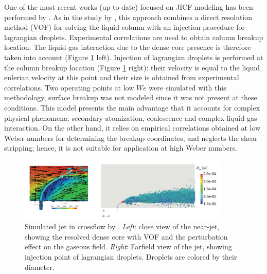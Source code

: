 One of the most recent works (up to date) focused on JICF modeling has been performed by . As in the study by , this approach combines a direct resolution method (VOF) for solving the liquid column with an injection procedure for lagrangian droplets. Experimental correlations are used to obtain column breakup location. The liquid-gas interaction due to the dense core presence is therefore taken into account (Figure \ref{fig:fontes_2019_lagrangian_fields} left). Injection of lagrangian droplets is performed at the column breakup location (Figure \ref{fig:fontes_2019_lagrangian_fields} right): their velocity is equal to the liquid eulerian velocity at this point and their size is obtained from experimental correlations. Two operating points at low $We$ were simulated with this methodology, surface breakup was not modeled since it was not present at these conditions. This model presents the main advantage that it accounts for complex physical phenomena: secondary atomization, coalescence and complex liquid-gas interaction. On the other hand, it relies on empirical correlations obtained at low Weber numbers for determining the breakup coordinates, and neglects the shear stripping; hence, it is not suitable for application at high Weber numbers.

\clearpage

\begin{figure}[ht]
    \centering
    \includegraphics[width=0.9\textwidth]{./part1_numerical_approaches/figures_ch3/fontes_2019_lagrangian_fields}
       \centering
    \caption{Simulated jet in crossflow by . \textsl{Left}: close view of the near-jet, showing the resolved dense core with VOF and the perturbation effect on the gaseous field. \textsl{Right}: Farfield view of the jet, showing injection point of lagrangian droplets. Droplets are colored by their diameter. }
    \label{fig:fontes_2019_lagrangian_fields}
\end{figure}

 